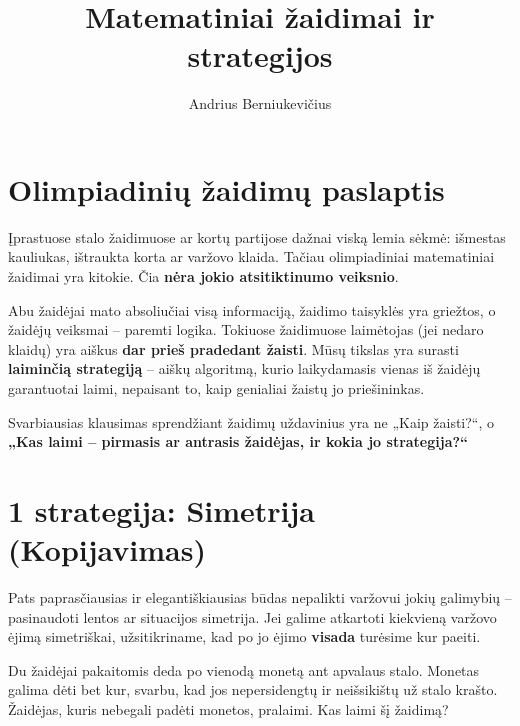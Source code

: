 \documentclass[11pt,a4paper]{scrartcl}
\title{Matematiniai žaidimai ir strategijos}
\author{Andrius Berniukevičius}
\begin{document}
\maketitle

\section{Olimpiadinių žaidimų paslaptis}

Įprastuose stalo žaidimuose ar kortų partijose dažnai viską lemia sėkmė: išmestas kauliukas, ištraukta korta ar varžovo klaida. Tačiau olimpiadiniai matematiniai žaidimai yra kitokie. Čia \textbf{nėra jokio atsitiktinumo veiksnio}. 

Abu žaidėjai mato absoliučiai visą informaciją, žaidimo taisyklės yra griežtos, o žaidėjų veiksmai – paremti logika. Tokiuose žaidimuose laimėtojas (jei nedaro klaidų) yra aiškus \textbf{dar prieš pradedant žaisti}. Mūsų tikslas yra surasti \textbf{laiminčią strategiją} – aiškų algoritmą, kurio laikydamasis vienas iš žaidėjų garantuotai laimi, nepaisant to, kaip genialiai žaistų jo priešininkas.

Svarbiausias klausimas sprendžiant žaidimų uždavinius yra ne „Kaip žaisti?“, o \textbf{„Kas laimi – pirmasis ar antrasis žaidėjas, ir kokia jo strategija?“}

\section{1 strategija: Simetrija (Kopijavimas)}

Pats paprasčiausias ir elegantiškiausias būdas nepalikti varžovui jokių galimybių – pasinaudoti lentos ar situacijos simetrija. Jei galime atkartoti kiekvieną varžovo ėjimą simetriškai, užsitikriname, kad po jo ėjimo \textbf{visada} turėsime kur paeiti.

\begin{example}
Du žaidėjai pakaitomis deda po vienodą monetą ant apvalaus stalo. Monetas galima dėti bet kur, svarbu, kad jos nepersidengtų ir neišsikištų už stalo krašto. Žaidėjas, kuris nebegali padėti monetos, pralaimi. Kas laimi šį žaidimą?
\end{example}
\end{document}
